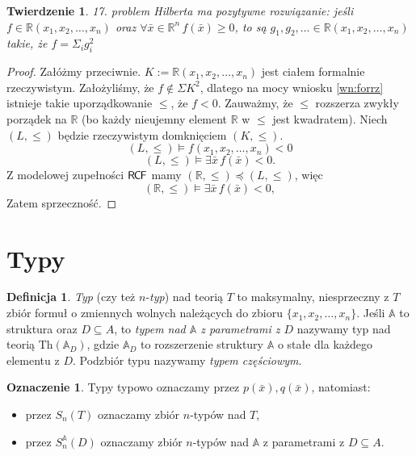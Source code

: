 \documentclass{article}
\newcommand{\R}{\mathbb{R}}
\newcommand{\A}{\mathbb{A}}
\theoremstyle{plain}
\newtheorem{tw}[thm]{Twierdzenie}
\theoremstyle{definition}
\newtheorem{df}[thm]{Definicja}
\newtheorem{ozn}[thm]{Oznaczenie}
\theoremstyle{remark}
\newcommand{\RCF}{\mathsf{R \mkern-1.7mu C \mkern-1.4mu F}}
\newcommand{\Th}{\text{Th}}
\begin{document}
\begin{tw}
	 17. problem Hilberta ma pozytywne rozwiązanie:
	 jeśli $f \in \R(x_1, x_2, \ldots, x_n)$ oraz $\forall \bar{x} \in \R^n \, f(\bar{x}) \geq 0$,
	 to są $g_1, g_2, \ldots \in \R(x_1, x_2, \ldots, x_n)$ takie, że $f = \Sigma_i g_i^2$
\end{tw}
\begin{proof}
	 Załóżmy przeciwnie.
	 $K := \R(x_1, x_2, \ldots, x_n) $ jest ciałem formalnie rzeczywistym.
	 Założyliśmy, że $f \not \in \Sigma K^2$, dlatego na mocy wniosku \ref{wn:forrz} istnieje takie uporządkowanie $\leq$,
	 że $f < 0$.
	 Zauważmy, że $\leq$ rozszerza zwykły porządek na $\R$ (bo każdy nieujemny element $\R$ w $\leq$ jest kwadratem).
	 Niech $(L, \leq)$ będzie rzeczywistym domknięciem $(K, \leq)$.
	 \[
	 	 (L, \leq) \models f(x_1, x_2, \ldots, x_n ) < 0
	 \]
	 \[
	 	 (L, \leq) \models \exists \bar{x}  \, f(\bar{x}) < 0.
	 \]
	 Z modelowej zupełności $\RCF$ mamy $(\R, \leq) \preccurlyeq (L, \leq)$, więc
	 \[
	 	 (\R, \leq) \models  \exists \bar{x}  \, f(\bar{x}) < 0,
	 \]
Zatem sprzeczność.
\end{proof}


\section{Typy}

\begin{df}
	\textit{Typ} (czy też $n$-\textit{typ}) nad teorią $T$ to maksymalny, niesprzeczny z $T$ zbiór formuł o zmiennych wolnych należących do zbioru $\{x_1, x_2, \ldots, x_n\}$.
		Jeśli $\A$ to struktura oraz $D \subseteq A$, to \textit{typem nad $\A$ z parametrami z $D$} nazywamy typ nad teorią $\Th(\A_D)$, gdzie $\A_D$ to rozszerzenie struktury $\A$ o stałe dla każdego elementu z $D$.
		Podzbiór typu nazywamy \textit{typem częściowym}.
\end{df}

\begin{ozn}
	Typy typowo oznaczamy przez $p(\bar{x}), q(\bar{x})$, natomiast:
	 ~\begin{itemize}
		 \item przez $S_n(T)$ oznaczamy zbiór $n$-typów nad $T$,
		 \item przez $S_n^{\A}(D)$ oznaczamy zbiór $n$-typów nad $\A$ z parametrami z $D \subseteq A$.
	 \end{itemize}
\end{ozn}
\end{document}
